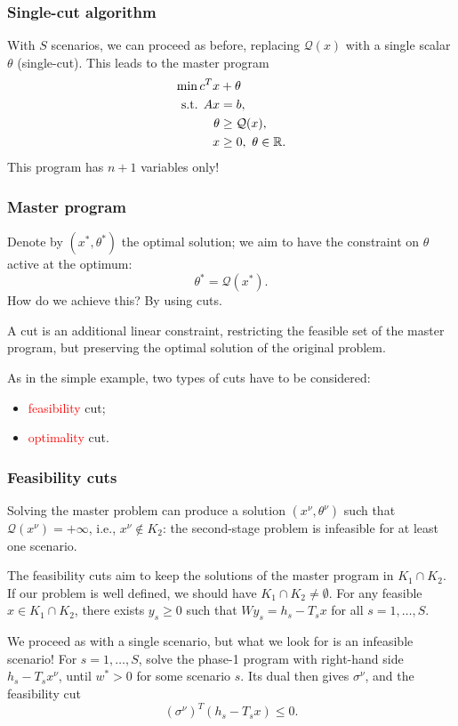 \documentclass[aspectratio=169]{beamer}
\begin{document}
\begin{frame}
\frametitle{Single-cut algorithm}
	
With $S$ scenarios, we can proceed as before, replacing $\mathcal{Q}(x)$ with a single scalar $\theta$ (single-cut).
This leads to the {\red master program}
\begin{align*}
	\min c^Tx & + \theta \\
	\text{s.t. } Ax & = b, \\
	\theta &\geq \mathcal{Q}(x),\\
	x & \geq 0,\ \theta \in {\mathbb{R}}.
\end{align*}
This program has $n+1$ variables only!

\end{frame}

\begin{frame}
\frametitle{Master program}
	
Denote by $(x^*, \theta^*)$ the optimal solution; we aim to have the constraint on $\theta$ active at the optimum:
\[
\theta^* = \mathcal{Q}(x^*).
\]
How do we achieve this? By using cuts.
	
\mbox{}

A cut is an additional linear constraint, restricting the feasible set of the master program, but preserving the optimal solution of the original problem.
	
\mbox{}
	
As in the simple example, two types of cuts have to be considered:
\begin{itemize}
\item
\textcolor{red}{feasibility} cut;
\item
\textcolor{red}{optimality} cut.
\end{itemize}
	
\end{frame}

\begin{frame}
\frametitle{Feasibility cuts}

Solving the master problem can produce a solution $(x^{\nu}, \theta^{\nu})$ such that $\mathcal{Q}(x^{\nu}) = +\infty$, i.e., $x^{\nu} \notin K_2$: the second-stage problem is infeasible for at least one scenario.

\mbox{}

The {\blue feasibility cuts} aim to keep the solutions of the master program in $K_1 \cap K_2$.
If our problem is well defined, we should have $K_1 \cap K_2 \ne \emptyset$.
For any feasible $x \in K_1 \cap K_2$, there exists $y_s \geq 0$ such that $Wy_s = h_s-T_sx$ for all $s = 1, \ldots, S$.

\mbox{}

We proceed as with a single scenario, but what we look for is an infeasible scenario!
For $s = 1,\ldots,S$, solve the phase-1 program with right-hand side $h_s - T_sx^{\nu}$, until $w^* > 0$ for some scenario $s$.
Its dual then gives $\sigma^{\nu}$, and the feasibility cut
\[
(\sigma^{\nu})^T(h_s-T_sx) \leq 0.
\]

\end{frame}
\end{document}
